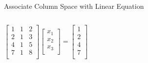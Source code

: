 \documentclass{beamer}
\begin{document}
\begin{frame}{Associate Column Space with Linear Equation}
\begin{columns}
    \begin{equation*}
        \left[ \begin{matrix}
            1&		1&		2\\
            2&		1&		3\\
            4&		1&		5\\
            7&		1&		8\\
        \end{matrix} \right] \left[ \begin{array}{c}
            x_1\\
            x_2\\
            x_3\\
        \end{array} \right] =\left[ \begin{array}{c}
            1\\
            2\\
            4\\
            7\\
        \end{array} \right]
    \end{equation*}
    \end{columns}
\end{frame}
\end{document}
